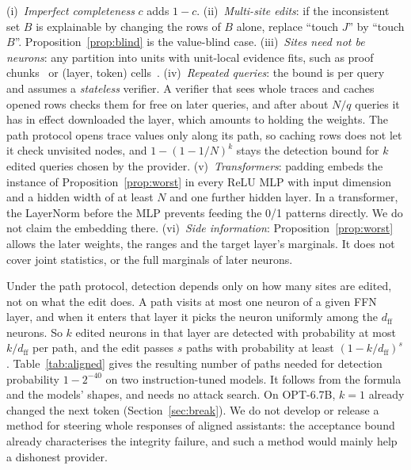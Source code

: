 \begin{remark}[scope]
\label{rem:scope}
(i)~\emph{Imperfect completeness} $c$ adds $1-c$.
(ii)~\emph{Multi-site edits}: if the inconsistent set $B$ is explainable by changing the rows of $B$
alone, replace ``touch $J$'' by ``touch $B$''. Proposition~\ref{prop:blind} is the value-blind case.
(iii)~\emph{Sites need not be neurons}: any partition into units with unit-local evidence fits, such
as proof chunks~\cite{slp} or (layer, token) cells~\cite{commitllm2026}.
(iv)~\emph{Repeated queries}: the bound is per query and assumes a \emph{stateless} verifier. A
verifier that sees whole traces and caches opened rows checks them for free on later queries, and
after about $N/q$ queries it has in effect downloaded the layer, which amounts to holding the
weights. The path protocol opens trace values only along its path, so caching rows does not let it
check unvisited nodes, and $1-(1-1/N)^k$ stays the detection bound for $k$ edited queries chosen
by the provider.
(v)~\emph{Transformers}: padding embeds the instance of Proposition~\ref{prop:worst} in every ReLU
MLP with input dimension and a hidden width of at least $N$ and one further hidden layer. In a
transformer, the LayerNorm before the MLP prevents feeding the 0/1 patterns directly. We do not
claim the embedding there.
(vi)~\emph{Side information}: Proposition~\ref{prop:worst} allows the later weights, the ranges and
the target layer's marginals. It does not cover joint statistics, or the full marginals of later
neurons.
\end{remark}

 Under the path protocol, detection depends only on how many sites
are edited, not on what the edit does. A path visits at most one neuron of a given FFN layer, and
when it enters that layer it picks the neuron uniformly among the $d_{\mathrm{ff}}$ neurons. So $k$
edited neurons in that layer are detected with probability at most $k/d_{\mathrm{ff}}$ per path, and the edit passes $s$ paths with
probability at least $(1-k/d_{\mathrm{ff}})^s$. Table~\ref{tab:aligned} gives the resulting number of
paths needed for detection probability $1-2^{-40}$ on two instruction-tuned models. It follows from
the formula and the models' shapes, and needs no attack search. On OPT-6.7B, $k=1$ already changed
the next token (Section~\ref{sec:break}). We do not develop or release a method for steering whole
responses of aligned assistants: the acceptance bound already characterises the integrity failure,
and such a method would mainly help a dishonest provider.

